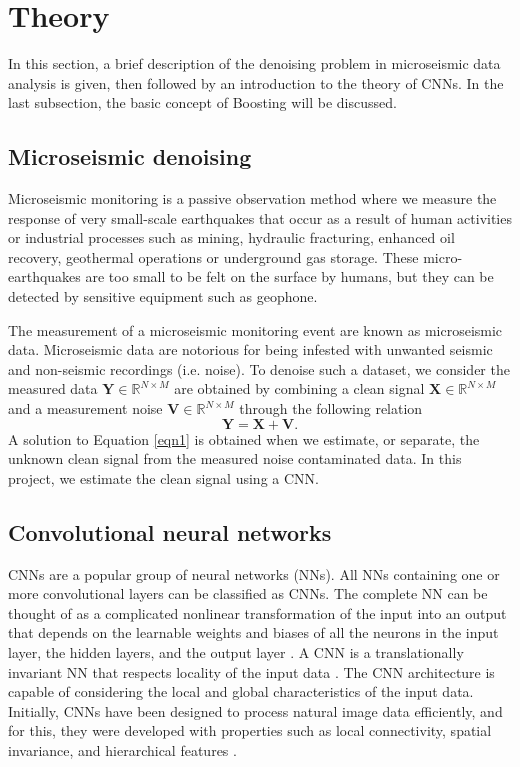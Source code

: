 \documentclass[a4paper]{article}
\begin{document}
\section{Theory}
In this section, a brief description of the denoising problem in microseismic data analysis is given, then followed by an introduction to the theory of CNNs. In the last subsection, the basic concept of Boosting will be discussed. 

\subsection{Microseismic denoising}

Microseismic monitoring is a passive observation method where we measure the response of very small-scale earthquakes that occur as a result of human activities or industrial processes such as mining, hydraulic fracturing, enhanced oil recovery, geothermal operations or underground gas storage. These micro-earthquakes are too small to be felt on the surface by humans, but they can be detected by sensitive equipment such as geophone. 

The measurement of a microseismic monitoring event are known as microseismic data. Microseismic data are notorious for being infested with unwanted seismic and non-seismic recordings (i.e. noise). To denoise such a dataset, we consider the measured data $\mathbf{Y}\in \mathbb{R}^{N\times M}$ are obtained by combining a clean signal $\mathbf{X}\in \mathbb{R}^{N\times M}$ and a measurement noise $\mathbf{V}\in \mathbb{R}^{N\times M}$ through the following relation
\begin{equation}
\mathbf{Y} = \mathbf{X} + \mathbf{V}.
\label{eqn1}
\end{equation}
A solution to Equation \ref{eqn1} is obtained when we estimate, or separate, the unknown clean signal from the measured noise contaminated data. In this project, we estimate the clean signal using a CNN.

\subsection{Convolutional neural networks}

CNNs are a popular group of neural networks (NNs). All NNs containing one or more convolutional layers can be classified as CNNs. The complete NN can be thought of as a complicated nonlinear transformation of the input into an output that depends on the learnable weights and biases of all the neurons in the input layer, the hidden layers, and the output layer \cite{Pankaj}. A CNN is a translationally invariant NN that respects locality of the input data \cite{Pankaj}. The CNN architecture is capable of considering the local and global characteristics of the input data. Initially, CNNs have been designed to process natural image data efficiently, and for this, they were developed with properties such as local connectivity, spatial invariance, and hierarchical features \cite{MLbrain}.
\end{document}
